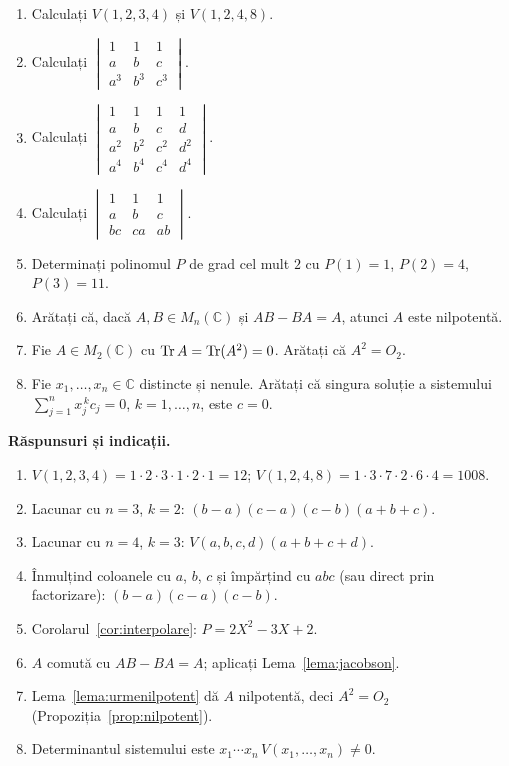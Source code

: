 \begin{enumerate}[label=\textbf{\arabic*.},leftmargin=*]
\item Calculați $V(1,2,3,4)$ și $V(1,2,4,8)$.
\item Calculați $\begin{vmatrix}1&1&1\\a&b&c\\a^3&b^3&c^3\end{vmatrix}$.
\item Calculați $\begin{vmatrix}1&1&1&1\\a&b&c&d\\a^2&b^2&c^2&d^2\\a^4&b^4&c^4&d^4\end{vmatrix}$.
\item Calculați $\begin{vmatrix}1&1&1\\a&b&c\\bc&ca&ab\end{vmatrix}$.
\item Determinați polinomul $P$ de grad cel mult $2$ cu $P(1)=1$, $P(2)=4$, $P(3)=11$.
\item Arătați că, dacă $A,B\in M_n(\mathbb{C})$ și $AB-BA=A$, atunci $A$ este nilpotentă.
\item Fie $A\in M_2(\mathbb{C})$ cu $\operatorname{Tr} A=\operatorname{Tr}(A^2)=0$. Arătați că $A^2=O_2$.
\item Fie $x_1,\dots,x_n\in\mathbb{C}$ distincte și nenule. Arătați că singura soluție a sistemului $\sum_{j=1}^nx_j^{\,k}c_j=0$, $k=1,\dots,n$, este $c=0$.
\end{enumerate}

\medskip\noindent\textbf{Răspunsuri și indicații.}
\begin{enumerate}[label=\textbf{\arabic*.},leftmargin=*]
\item $V(1,2,3,4)=1\cdot2\cdot3\cdot1\cdot2\cdot1=12$; $V(1,2,4,8)=1\cdot3\cdot7\cdot2\cdot6\cdot4=1008$.
\item Lacunar cu $n=3$, $k=2$: $(b-a)(c-a)(c-b)(a+b+c)$.
\item Lacunar cu $n=4$, $k=3$: $V(a,b,c,d)(a+b+c+d)$.
\item Înmulțind coloanele cu $a$, $b$, $c$ și împărțind cu $abc$ (sau direct prin factorizare): $(b-a)(c-a)(c-b)$.
\item Corolarul~\ref{cor:interpolare}: $P=2X^2-3X+2$.
\item $A$ comută cu $AB-BA=A$; aplicați Lema~\ref{lema:jacobson}.
\item Lema~\ref{lema:urmenilpotent} dă $A$ nilpotentă, deci $A^2=O_2$ (Propoziția~\ref{prop:nilpotent}).
\item Determinantul sistemului este $x_1\cdots x_n\,V(x_1,\dots,x_n)\neq0$.
\end{enumerate}

\setlength{\parskip}{2pt}
\addtolength{\jot}{-3pt}
